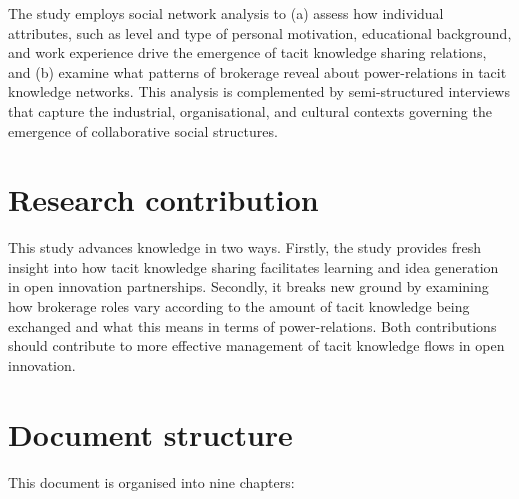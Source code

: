 The study employs social network analysis to (a) assess how individual attributes, such as level and type of personal motivation, educational background, and work experience drive the emergence of tacit knowledge sharing relations, and (b) examine what patterns of brokerage reveal about power-relations in tacit knowledge networks. This analysis is complemented by semi-structured interviews that capture the industrial, organisational, and cultural contexts governing the emergence of collaborative social structures. \medskip  

\section{Research contribution}

This study advances knowledge in two ways. Firstly, the study provides fresh insight into how tacit knowledge sharing facilitates learning and idea generation in open innovation partnerships. Secondly, it breaks new ground by examining how brokerage roles vary according to the amount of tacit knowledge being exchanged and what this means in terms of power-relations. Both contributions should contribute to more effective management of tacit knowledge flows in open innovation. \medskip

\section{Document structure}

This document is organised into nine chapters:


